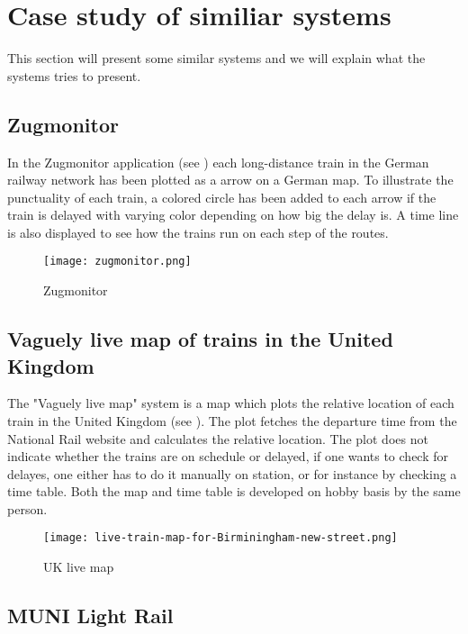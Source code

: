 \clearpage
\section{Case study of similiar systems}
\label{sect:backgroundExamples}
This section will present some similar systems and we will explain what the
systems tries to present.
\subsection{Zugmonitor}
\label{sub:subsection_zugmonitor}

In the Zugmonitor application (see ) each long-distance 
train in the German railway network has been plotted as a arrow on a German 
map. To illustrate the punctuality of each train, a colored circle has been 
added to each arrow if the train is delayed with varying color depending on 
how big the delay is. A time line is also displayed to see how the trains run 
on each step of the routes. 

\begin{figure}[!htbp]
	\texttt{[image: zugmonitor.png]}
	\caption[Zugmonitor]{Zugmonitor \cite{zugmonitor}}
	\label{fig:zugmonitor}
\end{figure}

\subsection{Vaguely live map of trains in the United Kingdom}
\label{sub:subsection_ukLiveMap}

The "Vaguely live map" system is a map which plots the relative location of 
each train in the United Kingdom (see ). The plot fetches 
the departure time from the  National Rail website and calculates the relative 
location. The plot does not indicate whether the trains are on schedule or 
delayed, if one wants to check for delayes, one either has to do it manually 
on station, or for instance by checking a time table\cite{trainTimesUK}. Both 
the map and time table is developed on hobby basis by the same person. 

\begin{figure}[!htbp]
	\texttt{[image: live-train-map-for-Birminingham-new-street.png]}
	\caption[UK live map]{UK live map \cite{ukLiveMap}}
	\label{fig:ukLiveMap}
\end{figure}

\subsection{MUNI Light Rail}
\label{sub:subsection_muniLightRail}

